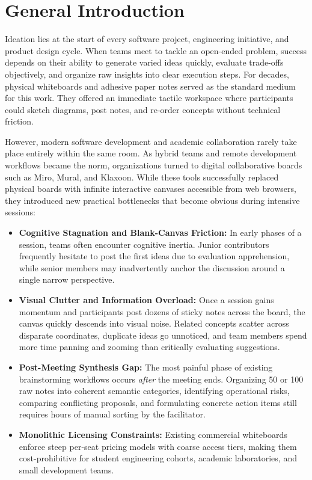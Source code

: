 \chapter*{General Introduction}

\noindent Ideation lies at the start of every software project, engineering initiative, and product design cycle. When teams meet to tackle an open-ended problem, success depends on their ability to generate varied ideas quickly, evaluate trade-offs objectively, and organize raw insights into clear execution steps. For decades, physical whiteboards and adhesive paper notes served as the standard medium for this work. They offered an immediate tactile workspace where participants could sketch diagrams, post notes, and re-order concepts without technical friction. 

However, modern software development and academic collaboration rarely take place entirely within the same room. As hybrid teams and remote development workflows became the norm, organizations turned to digital collaborative boards such as Miro, Mural, and Klaxoon. While these tools successfully replaced physical boards with infinite interactive canvases accessible from web browsers, they introduced new practical bottlenecks that become obvious during intensive sessions:

\begin{itemize}[leftmargin=1.5em]
    \item \textbf{Cognitive Stagnation and Blank-Canvas Friction:} In early phases of a session, teams often encounter cognitive inertia. Junior contributors frequently hesitate to post the first ideas due to evaluation apprehension, while senior members may inadvertently anchor the discussion around a single narrow perspective.
    \item \textbf{Visual Clutter and Information Overload:} Once a session gains momentum and participants post dozens of sticky notes across the board, the canvas quickly descends into visual noise. Related concepts scatter across disparate coordinates, duplicate ideas go unnoticed, and team members spend more time panning and zooming than critically evaluating suggestions.
    \item \textbf{Post-Meeting Synthesis Gap:} The most painful phase of existing brainstorming workflows occurs \textit{after} the meeting ends. Organizing 50 or 100 raw notes into coherent semantic categories, identifying operational risks, comparing conflicting proposals, and formulating concrete action items still requires hours of manual sorting by the facilitator.
    \item \textbf{Monolithic Licensing Constraints:} Existing commercial whiteboards enforce steep per-seat pricing models with coarse access tiers, making them cost-prohibitive for student engineering cohorts, academic laboratories, and small development teams.
\end{itemize}

